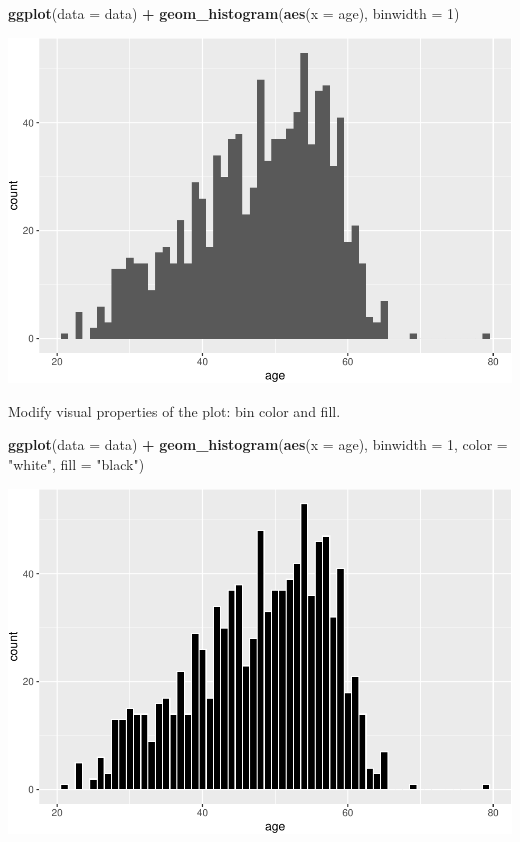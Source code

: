 \documentclass[
]{book}
\newenvironment{Shaded}{\begin{snugshade}}{\end{snugshade}}
\newcommand{\AttributeTok}[1]{\textcolor[rgb]{0.13,0.29,0.53}{#1}}
\newcommand{\DecValTok}[1]{\textcolor[rgb]{0.00,0.00,0.81}{#1}}
\newcommand{\FunctionTok}[1]{\textcolor[rgb]{0.13,0.29,0.53}{\textbf{#1}}}
\newcommand{\NormalTok}[1]{#1}
\newcommand{\SpecialCharTok}[1]{\textcolor[rgb]{0.81,0.36,0.00}{\textbf{#1}}}
\newcommand{\StringTok}[1]{\textcolor[rgb]{0.31,0.60,0.02}{#1}}
\begin{document}
\begin{Shaded}
\begin{Highlighting}[]
\FunctionTok{ggplot}\NormalTok{(}\AttributeTok{data =}\NormalTok{ data) }\SpecialCharTok{+}
  \FunctionTok{geom\_histogram}\NormalTok{(}\FunctionTok{aes}\NormalTok{(}\AttributeTok{x =}\NormalTok{ age), }\AttributeTok{binwidth =} \DecValTok{1}\NormalTok{)}
\end{Highlighting}
\end{Shaded}

\includegraphics{R-for-social-research-and-business-analytics_files/figure-latex/unnamed-chunk-18-1.pdf}

Modify visual properties of the plot: bin color and fill.

\begin{Shaded}
\begin{Highlighting}[]
\FunctionTok{ggplot}\NormalTok{(}\AttributeTok{data =}\NormalTok{ data) }\SpecialCharTok{+}
  \FunctionTok{geom\_histogram}\NormalTok{(}\FunctionTok{aes}\NormalTok{(}\AttributeTok{x =}\NormalTok{ age), }\AttributeTok{binwidth =} \DecValTok{1}\NormalTok{,}
                 \AttributeTok{color =} \StringTok{"white"}\NormalTok{, }\AttributeTok{fill =} \StringTok{"black"}\NormalTok{)}
\end{Highlighting}
\end{Shaded}

\includegraphics{R-for-social-research-and-business-analytics_files/figure-latex/unnamed-chunk-19-1.pdf}
\end{document}
